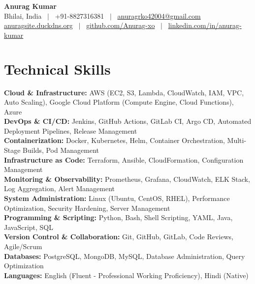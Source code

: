 \newcommand{\resumeSubHeadingListStart}{\begin{itemize}[leftmargin=0in, label={}]}
\newcommand{\resumeSubHeadingListEnd}{\end{itemize}\vspace{-5pt}}
\newcommand{\resumeItemListStart}{\begin{itemize}[leftmargin=0.2in, rightmargin=0in]}
\newcommand{\resumeItemListEnd}{\end{itemize}\vspace{-2pt}}



\begin{center}
    {\Huge\textbf{\color{accentcolor}Anurag Kumar}} \\ \vspace{8pt}
    \small
    Bhilai, India \ $|$ \ +91-8827316381 \ $|$ \ \href{mailto:anuragrko42004@gmail.com}{anuragrko42004@gmail.com}
    \\ \vspace{4pt}
    \href{http://anuragsite.duckdns.org}{anuragsite.duckdns.org} \ $|$ \ 
    \href{https://github.com/Anurag-xo}{github.com/Anurag-xo} \ $|$ \ 
    \href{https://www.linkedin.com/in/anurag-kumar-b1a790249}{linkedin.com/in/anurag-kumar}
\end{center}
\vspace{-15pt}

\section{Technical Skills}
\vspace{2pt}
\small{
\textbf{Cloud \& Infrastructure:} AWS (EC2, S3, Lambda, CloudWatch, IAM, VPC, Auto Scaling), Google Cloud Platform (Compute Engine, Cloud Functions), Azure \\
\textbf{DevOps \& CI/CD:} Jenkins, GitHub Actions, GitLab CI, Argo CD, Automated Deployment Pipelines, Release Management \\
\textbf{Containerization:} Docker, Kubernetes, Helm, Container Orchestration, Multi-Stage Builds, Pod Management \\
\textbf{Infrastructure as Code:} Terraform, Ansible, CloudFormation, Configuration Management \\
\textbf{Monitoring \& Observability:} Prometheus, Grafana, CloudWatch, ELK Stack, Log Aggregation, Alert Management \\
\textbf{System Administration:} Linux (Ubuntu, CentOS, RHEL), Performance Optimization, Security Hardening, Server Management \\
\textbf{Programming \& Scripting:} Python, Bash, Shell Scripting, YAML, Java, JavaScript, SQL \\
\textbf{Version Control \& Collaboration:} Git, GitHub, GitLab, Code Reviews, Agile/Scrum \\
\textbf{Databases:} PostgreSQL, MongoDB, MySQL, Database Administration, Query Optimization \\
\textbf{Languages:} English (Fluent - Professional Working Proficiency), Hindi (Native)
}

